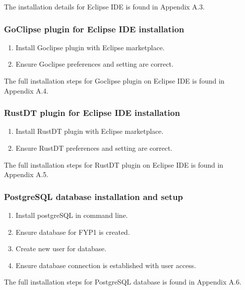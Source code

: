 The installation details for Eclipse IDE is found in Appendix A.3.

\subsubsection{GoClipse plugin for Eclipse IDE installation}

\begin{enumerate}[topsep=0pt,itemsep=-1ex,partopsep=1ex,parsep=1.5ex]
	\item Install Goclipse plugin with Eclipse marketplace.
	\item Ensure Goclipse preferences and setting are correct.  
\end{enumerate}

The full installation steps for Goclipse plugin on Eclipse IDE is found in Appendix A.4.

\subsubsection{RustDT plugin for Eclipse IDE installation}

\begin{enumerate}[topsep=0pt,itemsep=-1ex,partopsep=1ex,parsep=1.5ex]
	\item Install RustDT plugin with Eclipse marketplace.
	\item Ensure RustDT preferences and setting are correct. 
\end{enumerate}

The full installation steps for RustDT plugin on Eclipse IDE is found in Appendix A.5.

\subsubsection{PostgreSQL database installation and setup}

\begin{enumerate}[topsep=0pt,itemsep=-1ex,partopsep=1ex,parsep=1.5ex]
	\item Install postgreSQL in command line. 
	\item Ensure database for FYP1 is created. 
	\item Create new user for database.
	\item Ensure database connection is established with user access.
\end{enumerate}

The full installation steps for PostgreSQL database is found in Appendix A.6.


